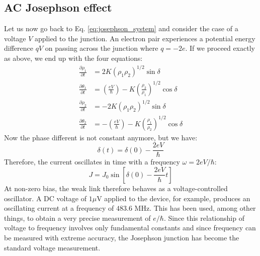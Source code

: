 \documentclass[a4paper,11pt]{article}
\newcommand{\ddp}[2]{\frac{\partial #1}{\partial #2 }}
\begin{document}
\subsection{AC Josephson effect}
Let us now go back to Eq. \ref{eq:josephson_system} and consider the case of a voltage $V$ applied to the junction. An electron pair experiences a potential energy difference $qV$ on passing across the junction where $q=-2e$. 
If we proceed exactly as above, we end up with the four equations:
\begin{equation}
\begin{aligned}
\ddp{\rho_1}{t} &= 2K (\rho_1 \rho_2)^{1/2} \sin{\delta}\\
\ddp{\theta_1}{t} &= \left( \frac{eV}{\hbar}\right)- K \left(\frac{\rho_2}{\rho_1}\right)^{1/2} \cos{\delta}\\ 
\ddp{\rho_2}{t} &= -2K (\rho_1 \rho_2)^{1/2} \sin{\delta}\\
\ddp{\theta_2}{t} &= -\left( \frac{eV}{\hbar}\right) - K \left (\frac{\rho_1}{\rho_2} \right)^{1/2} \cos{\delta}
\end{aligned}
\end{equation}
Now the phase different is not constant anymore, but we have:
\begin{equation}
    \delta(t) = \delta(0) - \frac{2eV}{\hbar}
\end{equation}
Therefore, the current oscillates in time with a frequency $\omega = 2eV/\hbar$:
\begin{equation}
    J = J_0 \sin \left[ \delta(0) - \frac{2eV}{\hbar}t \right]
\end{equation}
At non-zero bias, the weak link therefore behaves as a voltage-controlled oscillator. A DC voltage of $1 \mu$V applied to the device, for example, produces an oscillating current at a frequency of $483.6$ MHz. This has been used, among other things, to obtain a very precise measurement of $e/\hbar$. Since this relationship of voltage to frequency involves only fundamental constants and since frequency can be measured with extreme accuracy, the Josephson junction has become the standard voltage measurement. 
\end{document}
